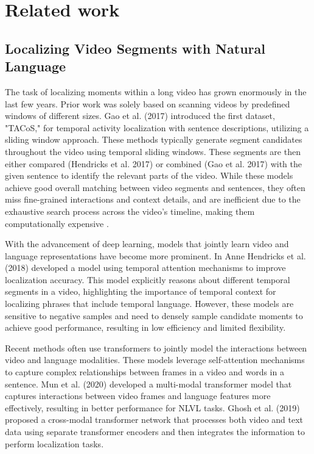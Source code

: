 \documentclass[conference]{IEEEtran}
\begin{document}
\section{Related work}

\subsection{Localizing Video Segments with Natural Language}

The task of localizing moments within a long video has grown enormously in the last few years. Prior work was solely based on scanning videos by predefined windows of different sizes. Gao et al. (2017) introduced the first dataset, "TACoS," for temporal activity localization with sentence descriptions, utilizing a sliding window approach. These methods typically generate segment candidates throughout the video using temporal sliding windows. These segments are then either compared (Hendricks et al. 2017) or combined (Gao et al. 2017) with the given sentence to identify the relevant parts of the video. While these models achieve good overall matching between video segments and sentences, they often miss fine-grained interactions and context details, and are inefficient due to the exhaustive search process across the video's timeline, making them computationally expensive \cite{b4}.

With the advancement of deep learning, models that jointly learn video and language representations have become more prominent. In \cite{b5} Anne Hendricks et al. (2018) developed a model using temporal attention mechanisms to improve localization accuracy. This model explicitly reasons about different temporal segments in a video, highlighting the importance of temporal context for localizing phrases that include temporal language. However, these models are sensitive to negative samples and need to densely sample candidate moments to achieve good performance, resulting in low efficiency and limited flexibility.

Recent methods often use transformers to jointly model the interactions between video and language modalities. These models leverage self-attention mechanisms to capture complex relationships between frames in a video and words in a sentence. Mun et al. (2020) developed a multi-modal transformer model that captures interactions between video frames and language features more effectively, resulting in better performance for NLVL tasks. Ghosh et al. (2019) proposed a cross-modal transformer network that processes both video and text data using separate transformer encoders and then integrates the information to perform localization tasks.
\end{document}
